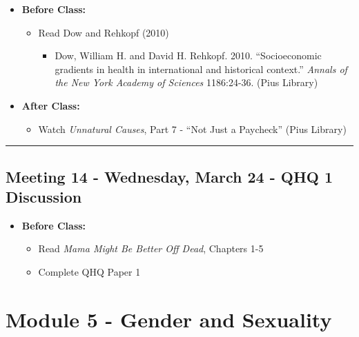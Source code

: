 \documentclass[
]{book}
\providecommand{\tightlist}{%
  \setlength{\itemsep}{0pt}\setlength{\parskip}{0pt}}
\begin{document}
\begin{itemize}
\tightlist
\item
  \textbf{Before Class:}

  \begin{itemize}
  \tightlist
  \item
    Read Dow and Rehkopf (2010)

    \begin{itemize}
    \tightlist
    \item
      Dow, William H. and David H. Rehkopf. 2010. ``Socioeconomic gradients in health in international and historical context.'' \emph{Annals of the New York Academy of Sciences} 1186:24-36. (Pius Library)
    \end{itemize}
  \end{itemize}
\item
  \textbf{After Class:}

  \begin{itemize}
  \tightlist
  \item
    Watch \emph{Unnatural Causes}, Part 7 - ``Not Just a Paycheck'' (Pius Library)
  \end{itemize}
\end{itemize}

\begin{center}\rule{0.5\linewidth}{0.5pt}\end{center}

\hypertarget{meeting-14---wednesday-march-24---qhq-1-discussion}{%
\subsection*{Meeting 14 - Wednesday, March 24 - QHQ 1 Discussion}\label{meeting-14---wednesday-march-24---qhq-1-discussion}}

\begin{itemize}
\tightlist
\item
  \textbf{Before Class:}

  \begin{itemize}
  \tightlist
  \item
    Read \emph{Mama Might Be Better Off Dead}, Chapters 1-5
  \item
    Complete QHQ Paper 1
  \end{itemize}
\end{itemize}

\newpage

\hypertarget{module-5---gender-and-sexuality}{%
\section{Module 5 - Gender and Sexuality}\label{module-5---gender-and-sexuality}}
\end{document}
